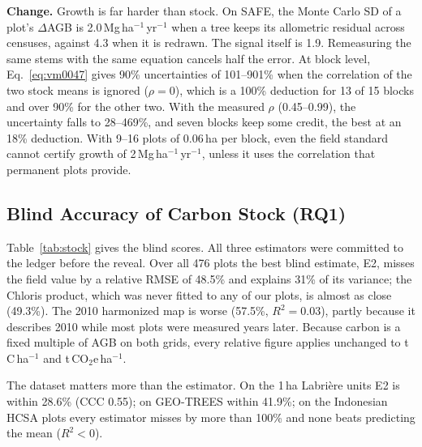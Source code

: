 \documentclass[conference,a4paper]{IEEEtran}
\begin{document}
\textbf{Change.} Growth is far harder than stock. On SAFE, the Monte Carlo SD of a plot's $\Delta$AGB is 2.0\,Mg\,ha$^{-1}$\,yr$^{-1}$ when a tree keeps its allometric residual across censuses, against 4.3 when it is redrawn. The signal itself is 1.9. Remeasuring the same stems with the same equation cancels half the error. At block level, Eq.~\ref{eq:vm0047} gives 90\% uncertainties of 101--901\% when the correlation of the two stock means is ignored ($\rho=0$), which is a 100\% deduction for 13 of 15 blocks and over 90\% for the other two. With the measured $\rho$ (0.45--0.99), the uncertainty falls to 28--469\%, and seven blocks keep some credit, the best at an 18\% deduction. With 9--16 plots of 0.06\,ha per block, even the field standard cannot certify growth of 2\,Mg\,ha$^{-1}$\,yr$^{-1}$, unless it uses the correlation that permanent plots provide.

\subsection{Blind Accuracy of Carbon Stock (RQ1)}
Table~\ref{tab:stock} gives the blind scores. All three estimators were committed to the ledger before the reveal. Over all 476 plots the best blind estimate, E2, misses the field value by a relative RMSE of 48.5\% and explains 31\% of its variance; the Chloris product, which was never fitted to any of our plots, is almost as close (49.3\%). The 2010 harmonized map is worse (57.5\%, $R^2=0.03$), partly because it describes 2010 while most plots were measured years later. Because carbon is a fixed multiple of AGB on both grids, every relative figure applies unchanged to t\,C\,ha$^{-1}$ and t\,CO$_2$e\,ha$^{-1}$.

The dataset matters more than the estimator. On the 1\,ha Labri\`ere units E2 is within 28.6\% (CCC 0.55); on GEO-TREES within 41.9\%; on the Indonesian HCSA plots every estimator misses by more than 100\% and none beats predicting the mean ($R^2<0$).
\end{document}

